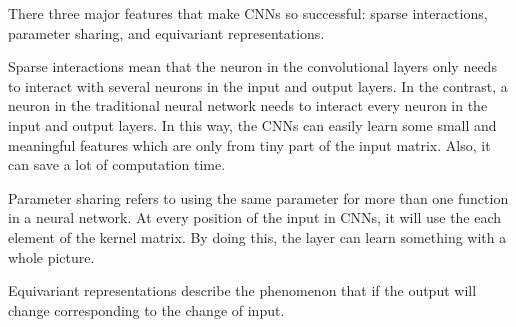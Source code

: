 \documentclass[11pt]{article}
\begin{document}


There three major features that make CNNs so successful: sparse interactions, parameter sharing, and equivariant representations.

Sparse interactions mean that the neuron in the convolutional layers only needs to interact with several neurons in the input and output layers. In the contrast, a neuron in the traditional neural network needs to interact every neuron in the input and output layers. In this way, the CNNs can easily learn some small and meaningful features which are only from tiny part of the input matrix. Also, it can save a lot of computation time.

Parameter sharing refers to using the same parameter for more than one function in a neural network. At every position of the input in CNNs, it will use the each element of the kernel matrix. By doing this, the layer can learn something with a whole picture.

Equivariant representations describe the phenomenon that if the output will change corresponding to the change of input. \\



\end{document}
